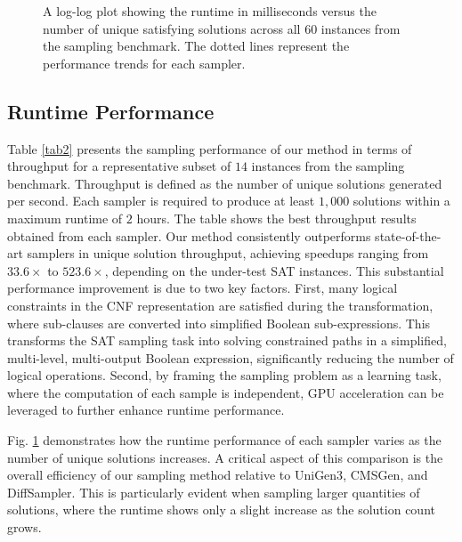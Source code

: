 \begin{figure}[t]
    \centering
    
    \caption{A log-log plot showing the runtime in milliseconds versus the number of unique satisfying solutions across all $60$ instances from the sampling benchmark. The dotted lines represent the performance trends for each sampler.}
    \label{fig2}
    \vspace{-0.5cm}
\end{figure}


\vspace{-0.2cm}
\subsection{Runtime Performance}
Table \ref{tab2} presents the sampling performance of our method in terms of throughput for a representative subset of $14$ instances from the sampling benchmark. Throughput is defined as the number of unique solutions generated per second. Each sampler is required to produce at least $1,000$ solutions within a maximum runtime of $2$ hours. The table shows the best throughput results obtained from each sampler. Our method consistently outperforms state-of-the-art samplers in unique solution throughput, achieving speedups ranging from $33.6\times$ to $523.6\times$, depending on the under-test SAT instances. This substantial performance improvement is due to two key factors. First, many logical constraints in the CNF representation are satisfied during the transformation, where sub-clauses are converted into simplified Boolean sub-expressions. This transforms the SAT sampling task into solving constrained paths in a simplified, multi-level, multi-output Boolean expression, significantly reducing the number of logical operations. Second, by framing the sampling problem as a learning task, where the computation of each sample is independent, GPU acceleration can be leveraged to further enhance runtime performance.

Fig. \ref{fig2} demonstrates how the runtime performance of each sampler varies as the number of unique solutions increases. A critical aspect of this comparison is the overall efficiency of our sampling method relative to {\sc UniGen3}, {\sc CMSGen}, and {\sc DiffSampler}. This is particularly evident when sampling larger quantities of solutions, where the runtime shows only a slight increase as the solution count grows.



\vspace{-0.2cm}
